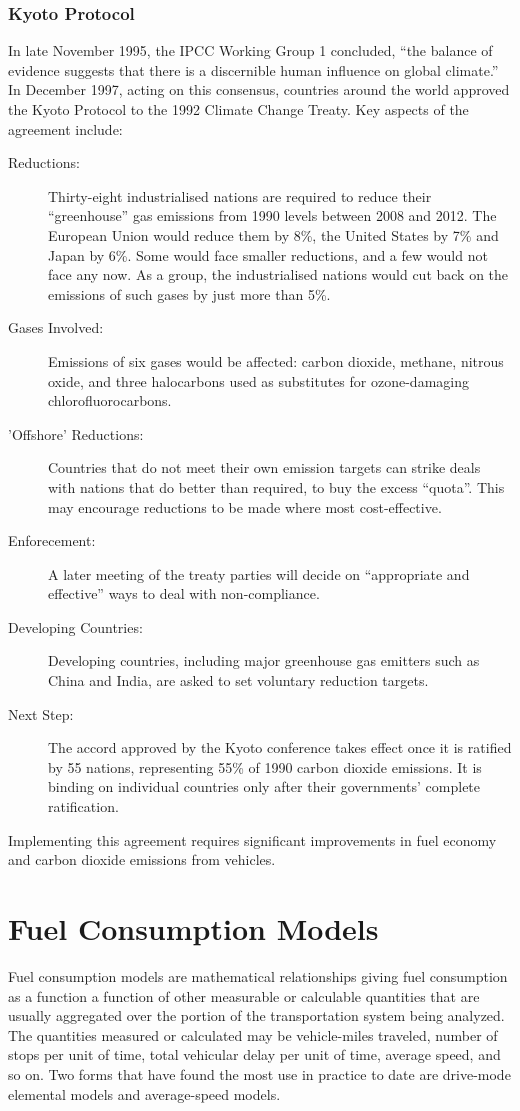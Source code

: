 \subsubsection{Kyoto Protocol}
In late November 1995, the IPCC Working Group 1 concluded, “the balance of evidence suggests that there is a discernible human influence on global climate.” In December 1997, acting on this consensus, countries around the world approved the Kyoto Protocol to the 1992 Climate Change Treaty. Key aspects of the agreement include:
\begin{description}
	\item [Reductions:] Thirty-eight industrialised nations are required to reduce their “greenhouse” gas emissions from 1990 levels between 2008 and 2012. The European Union would reduce them by 8\%, the United States by 7\% and Japan by 6\%. Some would face smaller reductions, and a few would not face any now. As a group, the industrialised nations would cut back on the emissions of such gases by just more than 5\%.
	\item [Gases Involved:] Emissions of six gases would be affected: carbon dioxide, methane, nitrous oxide, and three halocarbons used as substitutes for ozone-damaging chlorofluorocarbons.
	\item ['Offshore' Reductions:] Countries that do not meet their own emission targets can strike deals with nations that do better than required, to buy the excess “quota”. This may encourage reductions to be made where most cost-effective.
	\item [Enforecement:] A later meeting of the treaty parties will decide on “appropriate and effective” ways to deal with non-compliance.
	\item [Developing Countries:] Developing countries, including major greenhouse gas emitters such as China and India, are asked to set voluntary reduction targets.
	\item [Next Step:] The accord approved by the Kyoto conference takes effect once it is ratified by 55 nations, representing 55\% of 1990 carbon dioxide emissions. It is binding on individual countries only after their governments' complete ratification.
\end{description}
Implementing this agreement requires significant improvements in fuel economy and carbon dioxide emissions from vehicles.
%
\section{Fuel Consumption Models}
Fuel consumption models are mathematical relationships giving fuel consumption as a function a function of other measurable or calculable quantities that are usually aggregated over the portion of the transportation system being analyzed. The quantities measured or calculated may be vehicle-miles traveled, number of stops per unit of time, total vehicular delay per unit of time, average speed, and so on. Two forms that have found the most use in practice to date are drive-mode elemental models and average-speed models.
